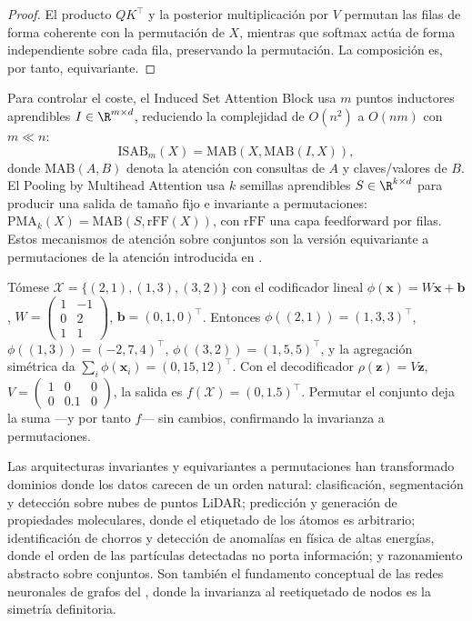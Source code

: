 \begin{proof}
El producto $QK^\top$ y la posterior multiplicaci\'on por $V$ permutan las filas
de forma coherente con la permutaci\'on de $X$, mientras que softmax act\'ua de
forma independiente sobre cada fila, preservando la permutaci\'on. La
composici\'on es, por tanto, equivariante.
\end{proof}

Para controlar el coste, el Induced Set Attention Block usa $m$ puntos inductores
aprendibles $I \in \R^{m \times d}$, reduciendo la complejidad de $O(n^2)$ a
$O(nm)$ con $m \ll n$:
\begin{equation}
  \text{ISAB}_m(X) = \text{MAB}(X, \text{MAB}(I, X)),
\end{equation}
donde $\text{MAB}(A, B)$ denota la atenci\'on con consultas de $A$ y
claves/valores de $B$. El Pooling by Multihead Attention usa $k$ semillas
aprendibles $S \in \R^{k \times d}$ para producir una salida de tama\~no fijo e
invariante a permutaciones: $\text{PMA}_k(X) = \text{MAB}(S, \text{rFF}(X))$, con
$\text{rFF}$ una capa feedforward por filas. Estos mecanismos de atenci\'on sobre
conjuntos son la versi\'on equivariante a permutaciones de la atenci\'on
introducida en .

\begin{example}
\label{ex:groups:deepsets-numerical}
T\'omese $\mathcal{X} = \{(2,1),(1,3),(3,2)\}$ con el codificador lineal
$\phi(\mathbf{x}) = W\mathbf{x} + \mathbf{b}$, $W = \left(\begin{smallmatrix} 1 &
-1 \\ 0 & 2 \\ 1 & 1 \end{smallmatrix}\right)$, $\mathbf{b} = (0,1,0)^\top$.
Entonces $\phi((2,1)) = (1,3,3)^\top$, $\phi((1,3)) = (-2,7,4)^\top$,
$\phi((3,2)) = (1,5,5)^\top$, y la agregaci\'on sim\'etrica da $\sum_i
\phi(\mathbf{x}_i) = (0,15,12)^\top$. Con el decodificador $\rho(\mathbf{z}) =
V\mathbf{z}$, $V = \left(\begin{smallmatrix} 1 & 0 & 0 \\ 0 & 0.1 & 0
\end{smallmatrix}\right)$, la salida es $f(\mathcal{X}) = (0, 1.5)^\top$. Permutar
el conjunto deja la suma ---y por tanto $f$--- sin cambios, confirmando la
invarianza a permutaciones.
\end{example}

Las arquitecturas invariantes y equivariantes a permutaciones han transformado
dominios donde los datos carecen de un orden natural: clasificaci\'on,
segmentaci\'on y detecci\'on sobre nubes de puntos LiDAR; predicci\'on y
generaci\'on de propiedades moleculares, donde el etiquetado de los \'atomos es
arbitrario; identificaci\'on de chorros y detecci\'on de anomal\'ias en f\'isica
de altas energ\'ias, donde el orden de las part\'iculas detectadas no porta
informaci\'on; y razonamiento abstracto sobre conjuntos. Son tambi\'en el
fundamento conceptual de las redes neuronales de grafos del ,
donde la invarianza al reetiquetado de nodos es la simetr\'ia definitoria.


